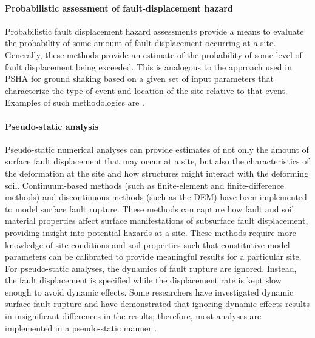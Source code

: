 \paragraph{Probabilistic assessment of fault-displacement hazard}
Probabilistic fault displacement hazard assessments provide a means to evaluate the probability of some amount of fault displacement occurring at a site. Generally, these methods provide an estimate of the probability of some level of fault displacement being exceeded. This is analogous to the approach used in PSHA for ground shaking based on a given set of input parameters that characterize the type of event and location of the site relative to that event. Examples of such methodologies are \citet{youngs2003methodology, petersen2011fault, moss2011probabilistic, hecker2013variability}.

\paragraph{Pseudo-static analysis}
Pseudo-static numerical analyses can provide estimates of not only the amount of surface fault displacement that may occur at a site, but also the characteristics of the deformation at the site and how structures might interact with the deforming soil. Continuum-based methods (such as finite-element and finite-difference methods) and discontinuous methods (such as the DEM) have been implemented to model surface fault rupture. These methods can capture how fault and soil material properties affect surface manifestations of subsurface fault displacement, providing insight into potential hazards at a site. These methods require more knowledge of site conditions and soil properties such that constitutive model parameters can be calibrated to provide meaningful results for a particular site. For pseudo-static analyses, the dynamics of fault rupture are ignored. Instead, the fault displacement is specified while the displacement rate is kept slow enough to avoid dynamic effects. Some researchers have investigated dynamic surface fault rupture \citep{oettle2015dynamic} and have demonstrated that ignoring dynamic effects results in insignificant differences in the results; therefore, most analyses are implemented in a pseudo-static manner \citep{anastasopoulos2007foundation, anastasopoulos2008numerical, bransby2008centrifuge_reverse, bransby2008centrifuge, oettle2013geotechnical, oettle2017numerical, garcia2018distinct, garcia2018distinct_2}.

